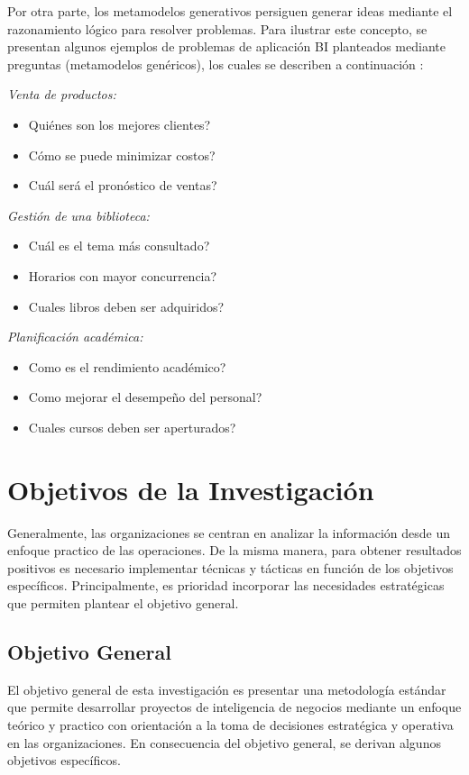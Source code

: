 \documentclass[11pt,titlepage]{report}
\begin{document}
Por otra parte, los metamodelos generativos persiguen generar ideas mediante el razonamiento lógico para resolver problemas. Para ilustrar este concepto, se presentan algunos ejemplos de problemas de aplicación BI planteados mediante preguntas (metamodelos genéricos), los cuales se describen a continuación \cite{web07}:
\begin{multicols}{2}
\textit{Venta de productos:}
\begin{itemize}
\item Quiénes son los mejores clientes?
\item Cómo se puede minimizar costos? 
\item Cuál será el pronóstico de ventas?
\end{itemize}

\textit{Gestión de una biblioteca:}
\begin{itemize}
\item Cuál es el tema más consultado?
\item Horarios con mayor concurrencia?
\item Cuales libros deben ser adquiridos?
\end{itemize}

\textit{Planificación académica:}
\begin{itemize}
	\item Como es el rendimiento académico?
	\item Como mejorar el desempeño del personal?
	\item Cuales cursos deben ser aperturados?
\end{itemize}
\end{multicols}
 


\section{Objetivos de la Investigación}

Generalmente, las organizaciones se centran en analizar la información desde un enfoque practico de las operaciones. De la misma manera, para obtener resultados positivos es necesario implementar técnicas y tácticas en función de los objetivos específicos. Principalmente, es prioridad incorporar las necesidades estratégicas que permiten plantear el objetivo general.

\subsection{Objetivo General}
El objetivo general de esta investigación es presentar una metodología estándar que permite desarrollar proyectos de inteligencia de negocios mediante un enfoque teórico y practico con orientación a la toma de decisiones estratégica y operativa en las organizaciones. En consecuencia del objetivo general, se derivan algunos objetivos específicos.
\end{document}
